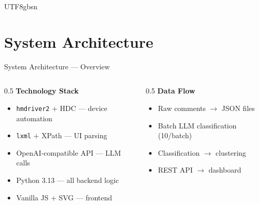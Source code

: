 \documentclass[11pt,aspectratio=169]{beamer}
\begin{document}
\begin{CJK*}{UTF8}{gbsn}
\section{System Architecture}

\begin{frame}{System Architecture --- Overview}
  \begin{figure}
    \centering
  \end{figure}

  \begin{columns}[T]
    \begin{column}{0.5\textwidth}
      \textbf{Technology Stack}
      \begin{itemize}
        \item \texttt{hmdriver2} + HDC --- device automation
        \item \texttt{lxml} + XPath --- UI parsing
        \item OpenAI-compatible API --- LLM calls
        \item Python 3.13 --- all backend logic
        \item Vanilla JS + SVG --- frontend
      \end{itemize}
    \end{column}
    \begin{column}{0.5\textwidth}
      \textbf{Data Flow}
      \begin{itemize}
        \item Raw comments $\rightarrow$ JSON files
        \item Batch LLM classification (10/batch)
        \item Classification $\rightarrow$ clustering
        \item REST API $\rightarrow$ dashboard
      \end{itemize}
    \end{column}
  \end{columns}
\end{frame}


\end{CJK*}
\end{document}
